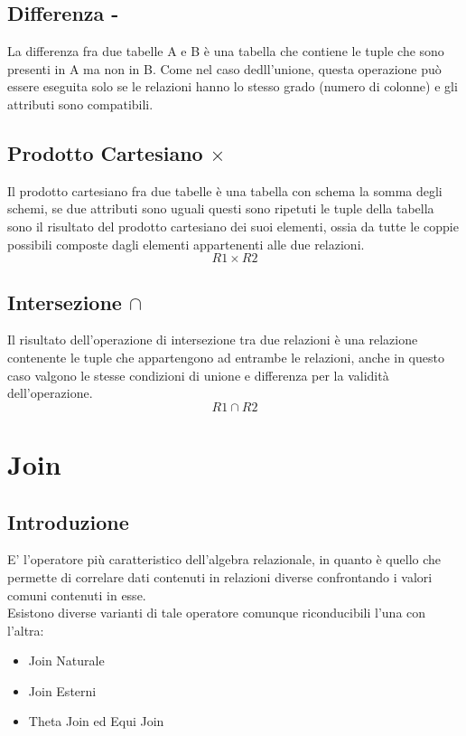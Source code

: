 \documentclass{report}
\begin{document}
\subsection{Differenza -}
La differenza fra due tabelle A e B è una tabella che contiene le tuple che sono presenti in A ma non in
B. Come nel caso dedll'unione, questa operazione può essere eseguita solo se le relazioni hanno lo stesso grado (numero di colonne) e gli attributi sono compatibili.\\

\newpage
\subsection{Prodotto Cartesiano $\times$}
Il prodotto cartesiano fra due tabelle è una tabella con schema la somma degli schemi, se due attributi
sono uguali questi sono ripetuti le tuple della tabella sono il risultato del prodotto cartesiano dei suoi elementi, ossia da tutte le coppie possibili composte dagli elementi appartenenti alle due relazioni.\\
$$R1\times R2$$

\subsection{Intersezione $\cap$}
Il risultato dell'operazione di intersezione tra due relazioni è una relazione contenente le tuple che appartengono ad entrambe le relazioni, anche in questo caso valgono le stesse condizioni di unione e differenza per la validità dell'operazione.\\
$$R1 \cap R2$$

\section{Join}
\subsection{Introduzione}
E’ l’operatore più caratteristico dell’algebra relazionale, in quanto è quello che permette di correlare dati contenuti in relazioni diverse confrontando i valori comuni contenuti in esse.\\
Esistono diverse varianti di tale operatore comunque riconducibili l’una con l’altra:
\begin{itemize} 
    \item Join Naturale
    \item Join Esterni
    \item Theta Join ed Equi Join\\
\end{itemize}
\end{document}
